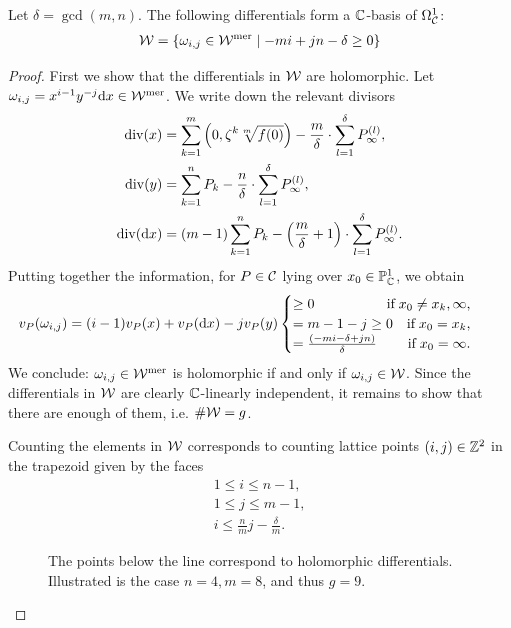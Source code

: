 \documentclass[main.tex]{subfiles}
\begin{document}
   \bigskip

     \begin{prop}\label{prop:holom_diff}
 Let $\delta = \gcd(m,n)$. The following differentials form  a $\mathbb{C}$-basis of $\Omega^1_{\mathcal{C}}$:
 \begin{align}\label{eq:holm_diff}
   \mathcal{W} =  \left\{  \omega_{i,j} \in \mathcal{W}^{\text{mer}}  \mid  -mi + jn - \delta \ge 0  \right\}
 \end{align}
     \end{prop}
     \begin{proof}
      First we show that the differentials in $\mathcal{W}$ are holomorphic.
      Let $\omega_{i,j} = x^{i-1}y^{-j} \mathrm d x \in \mathcal{W}^{\text{mer}}$. We write down the relevant divisors
      \begin{align*}
       \operatorname{div}(x) & = \sum_{k=1}^m \left(0,\zeta^k\sqrt[m]{f(0)}\right) - \frac{m}{\delta} \cdot \sum_{l = 1}^{\delta} P_{\infty}^{(l)}, \\
       \operatorname{div}(y) & = \sum_{k = 1}^n P_k - \frac{n}{\delta} \cdot \sum_{l = 1}^{\delta}  P_{\infty}^{(l)}, \\
       \operatorname{div}(\mathrm d x) & = (m-1)\sum_{k = 1}^n P_k - \left(\frac{m}{\delta} + 1\right)\cdot \sum_{l = 1}^{\delta}  P_{\infty}^{(l)}.
      \end{align*}
     Putting together the information, for $P \in \mathcal{C}$ lying over $x_0 \in \mathbb{P}^1_{\mathbb{C}}$, we obtain
     \begin{align}\label{eq:diff_cases}
      v_P(\omega_{i,j}) & = (i-1) v_P(x) + v_P(\dx)  - j v_P(y)
 \begin{cases}
  \ge 0 \hfill \text{if} \; x_0 \ne x_k,\infty, \\
  = m-1-j \ge 0 \quad \text{if} \; x_0 = x_k, \\
  = \frac{(-mi-\delta+jn)}{\delta} \hfill \text{if}\;  x_0 = \infty.
 \end{cases}
     \end{align}
     We conclude: $\omega_{i,j} \in \mathcal{W}^{\text{mer}}$ is holomorphic if and only if $\omega_{i,j} \in \mathcal{W}$. \abstand
     Since the differentials in $\mathcal{W}$ are clearly $\mathbb{C}$-linearly independent, it remains to show that
     there are enough of them, i.e. $\#\mathcal{W} = g$.
     \medskip

     Counting the elements in $\mathcal{W}$ corresponds to counting lattice points
     $(i,j) \in \mathbb{Z}^2$ in the trapezoid given by the faces
     \begin{align*}
 1 \le i \le n-1,\\
 1 \le j \le m-1, \\
 i \le \frac{n}{m}j - \frac{\delta}{m}.
     \end{align*}
      \begin{figure}[H]
      \begin{center}
   
      \end{center}
    \caption{The points below the line correspond to holomorphic differentials.
    Illustrated is the case $n=4,m=8$, and thus $g = 9$.}
    \label{fig:holom_diff}
\end{figure}


\end{proof}
\end{document}

